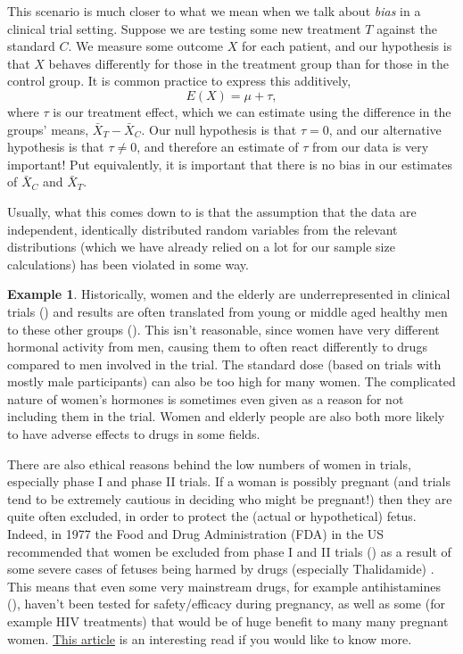 \documentclass[
  openany]{book}
\theoremstyle{definition}
\theoremstyle{definition}
\newtheorem{example}{Example}[chapter]
\theoremstyle{definition}
\theoremstyle{definition}
\theoremstyle{remark}
\begin{document}
This scenario is much closer to what we mean when we talk about \emph{bias} in a clinical trial setting. Suppose we are testing some new treatment \(T\) against the standard \(C\). We measure some outcome \(X\) for each patient, and our hypothesis is that \(X\) behaves differently for those in the treatment group than for those in the control group. It is common practice to express this additively,
\[E\left(X\right) = \mu + \tau,\]
where \(\tau\) is our treatment effect, which we can estimate using the difference in the groups' means, \(\bar{X}_T - \bar{X}_C\). Our null hypothesis is that \(\tau = 0\), and our alternative hypothesis is that \(\tau\neq{0}\), and therefore an estimate of \(\tau\) from our data is very important! Put equivalently, it is important that there is no bias in our estimates of \(\bar{X}_C\) and \(\bar{X}_T\).

Usually, what this comes down to is that the assumption that the data are independent, identically distributed random variables from the relevant distributions (which we have already relied on a lot for our sample size calculations) has been violated in some way.

\begin{example}
Historically, women and the elderly are underrepresented in clinical trials (\citet{cottingham2022gendered}) and results are often translated from young or middle aged healthy men to these other groups (\citet{vitale2017under}). This isn't reasonable, since women have very different hormonal activity from men, causing them to often react differently to drugs compared to men involved in the trial. The standard dose (based on trials with mostly male participants) can also be too high for many women. The complicated nature of women's hormones is sometimes even given as a reason for not including them in the trial. Women and elderly people are also both more likely to have adverse effects to drugs in some fields.

There are also ethical reasons behind the low numbers of women in trials, especially phase I and phase II trials. If a woman is possibly pregnant (and trials tend to be extremely cautious in deciding who might be pregnant!) then they are quite often excluded, in order to protect the (actual or hypothetical) fetus. Indeed, in 1977 the Food and Drug Administration (FDA) in the US recommended that women be excluded from phase I and II trials (\citet{nationalhistory}) as a result of some severe cases of fetuses being harmed by drugs (especially Thalidamide) . This means that even some very mainstream drugs, for example antihistamines (\citet{kar2012review}), haven't been tested for safety/efficacy during pregnancy, as well as some (for example HIV treatments) that would be of huge benefit to many many pregnant women. \href{https://www.politico.eu/article/telescope-hiv-aids-unitaid-gender-pregnant-trials/}{This article} is an interesting read if you would like to know more.
\end{example}
\end{document}
